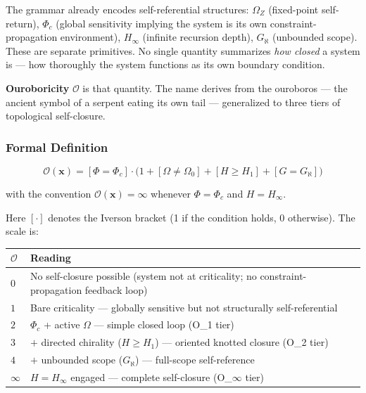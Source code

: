 \documentclass[12pt,a4paper]{article}
\begin{document}
The grammar already encodes self-referential structures: $\Omega_Z$ (fixed-point self-return), $\Phi_c$ (global sensitivity implying the system is its own constraint-propagation environment), $H_{\infty}$ (infinite recursion depth), $G_{\aleph}$ (unbounded scope). These are separate primitives. No single quantity summarizes \emph{how closed} a system is --- how thoroughly the system functions as its own boundary condition.

\textbf{Ouroboricity} $\mathcal{O}$ is that quantity. The name derives from the ouroboros --- the ancient symbol of a serpent eating its own tail --- generalized to three tiers of topological self-closure.

\subsubsection{Formal Definition}

\[\mathcal{O}(\mathbf{x}) = [\Phi = \Phi_c] \cdot \bigl(1 + [\Omega \neq \Omega_0] + [H \geq H_1] + [G = G_{\aleph}]\bigr)\]

with the convention $\mathcal{O}(\mathbf{x}) = \infty$ whenever $\Phi = \Phi_c$ and $H = H_{\infty}$.

Here $[\cdot]$ denotes the Iverson bracket (1 if the condition holds, 0 otherwise). The scale is:

\begin{table}[htbp]
\centering
\small
{}
\begin{tabularx}{\textwidth}{>{\centering\arraybackslash}X >{\centering\arraybackslash}X}
\toprule
\rowcolor{gray!25}\textbf{$\mathcal{O}$} & \textbf{Reading} \\
\midrule
\rowcolors{1}{white}{gray!10}
$0$ & No self-closure possible (system not at criticality; no constraint-propagation feedback loop) \\
$1$ & Bare criticality --- globally sensitive but not structurally self-referential \\
$2$ & $\Phi_c$ + active $\Omega$ --- simple closed loop (O\_1 tier) \\
$3$ & $+$ directed chirality ($H \geq H_1$) --- oriented knotted closure (O\_2 tier) \\
$4$ & $+$ unbounded scope ($G_{\aleph}$) --- full-scope self-reference \\
$\infty$ & $H = H_{\infty}$ engaged --- complete self-closure (O\_$\infty$ tier) \\
\bottomrule
\end{tabularx}
\end{table}
\end{document}

